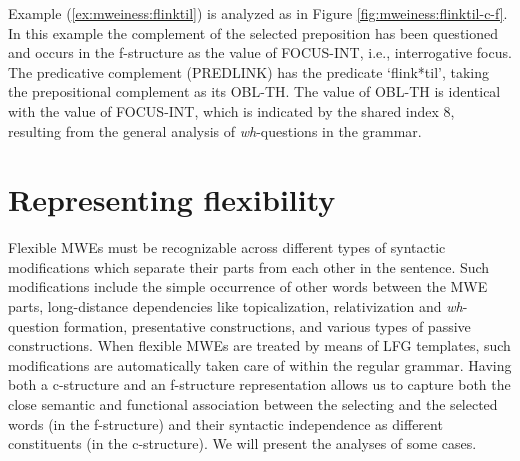 \documentclass[output=paper]{langsci/langscibook}
\begin{document}
Example  (\ref{ex:mweiness:flinktil}) is analyzed as in Figure \ref{fig:mweiness:flinktil-c-f}.
In this example the complement of the selected preposition has been questioned and occurs in the f-structure as the value of FOCUS-INT, i.e., interrogative focus.
The predicative complement (PREDLINK) has the predicate `flink*til', taking the prepositional complement as its OBL-TH.
The value of OBL-TH is identical with the value of  FOCUS-INT, which is indicated by the shared index 8, resulting from the general analysis of \textit{wh}-questions in the grammar.

\section{Representing flexibility}\label{sec:mweiness:variation}

%
%


Flexible MWEs must be recognizable across different types of syntactic modifications which separate their parts from each other in the sentence.
Such modifications include the simple occurrence of other words between the MWE parts, long-distance dependencies like topicalization, relativization and \textit{wh}-question formation, presentative constructions, and various types of passive constructions.
When flexible MWEs are treated by means of LFG templates, such modifications are automatically taken care of within the regular grammar.
Having both a c-structure and an f-structure representation allows us to capture both the close semantic and functional association between the selecting and the selected words (in the f-structure) and their syntactic independence as different constituents (in the c-structure).
We will present the analyses of some cases.
\end{document}
